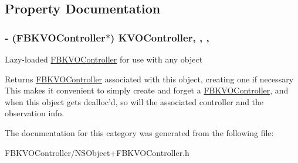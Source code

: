 \subsection{Property Documentation}
\hypertarget{category_n_s_object_07_f_b_k_v_o_controller_08_a1b8c562cef11b9d87f803d7721b5bd38}{
\subsubsection[{K\+V\+O\+Controller}]{\setlength{\rightskip}{0pt plus 5cm}-\/ ({\bf F\+B\+K\+V\+O\+Controller}$\ast$) K\+V\+O\+Controller\hspace{0.3cm}{\ttfamily [read]}, {\ttfamily [write]}, {\ttfamily [nonatomic]}, {\ttfamily [strong]}}}\label{category_n_s_object_07_f_b_k_v_o_controller_08_a1b8c562cef11b9d87f803d7721b5bd38}
Lazy-\/loaded \hyperlink{interface_f_b_k_v_o_controller}{F\+B\+K\+V\+O\+Controller} for use with any object \begin{DoxyReturn}{Returns}
\hyperlink{interface_f_b_k_v_o_controller}{F\+B\+K\+V\+O\+Controller} associated with this object, creating one if necessary  This makes it convenient to simply create and forget a \hyperlink{interface_f_b_k_v_o_controller}{F\+B\+K\+V\+O\+Controller}, and when this object gets dealloc'd, so will the associated controller and the observation info. 
\end{DoxyReturn}


The documentation for this category was generated from the following file\+:\begin{DoxyCompactItemize}
\item 
F\+B\+K\+V\+O\+Controller/N\+S\+Object+\+F\+B\+K\+V\+O\+Controller.\+h\end{DoxyCompactItemize}
